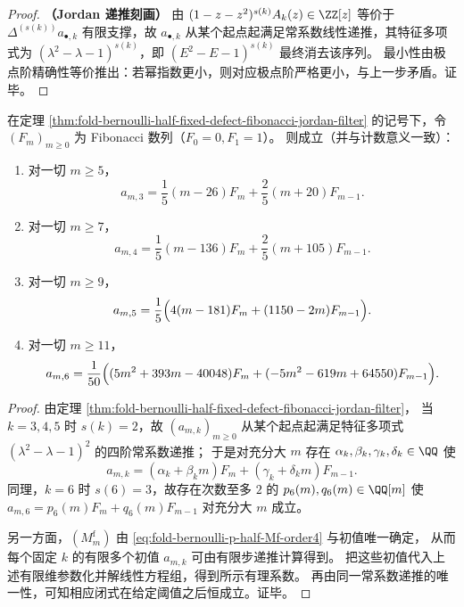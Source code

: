 \begin{proof}
\textbf{（Jordan 递推刻画）}
由 \((1-z-z^2)^{s(k)}A_k(z)\in\ZZ[z]\) 等价于 \(\Delta^{(s(k))}a_{\bullet,k}\) 有限支撑，故 \(a_{\bullet,k}\) 从某个起点起满足常系数线性递推，其特征多项式为 \((\lambda^2-\lambda-1)^{s(k)}\)，即 \((E^2-E-1)^{s(k)}\) 最终消去该序列。
最小性由极点阶精确性等价推出：若幂指数更小，则对应极点阶严格更小，与上一步矛盾。证毕。
\end{proof}


\begin{proposition}[缺陷阶 \(k=3,4,5,6\) 的显式闭式]\label{prop:fold-bernoulli-half-defect-3-6-explicit}
在定理 \ref{thm:fold-bernoulli-half-fixed-defect-fibonacci-jordan-filter} 的记号下，令 \((F_m)_{m\ge 0}\) 为 Fibonacci 数列（\(F_0=0,F_1=1\)）。
则成立（并与计数意义一致）：
\begin{enumerate}
  \item 对一切 \(m\ge 5\)，
  \[
  a_{m,3}
  =\frac{1}{5}(m-26)F_m+\frac{2}{5}(m+20)F_{m-1}.
  \]
  \item 对一切 \(m\ge 7\)，
  \[
  a_{m,4}
  =\frac{1}{5}(m-136)F_m+\frac{2}{5}(m+105)F_{m-1}.
  \]
  \item 对一切 \(m\ge 9\)，
  \[
  a_{m,5}
  =\frac{1}{5}\Bigl(4(m-181)F_m+(1150-2m)F_{m-1}\Bigr).
  \]
  \item 对一切 \(m\ge 11\)，
  \[
  a_{m,6}
  =\frac{1}{50}\Bigl((5m^2+393m-40048)F_m+(-5m^2-619m+64550)F_{m-1}\Bigr).
  \]
\end{enumerate}
\end{proposition}
\begin{proof}
由定理 \ref{thm:fold-bernoulli-half-fixed-defect-fibonacci-jordan-filter}，
当 \(k=3,4,5\) 时 \(s(k)=2\)，故 \((a_{m,k})_{m\ge 0}\) 从某个起点起满足特征多项式 \((\lambda^2-\lambda-1)^2\) 的四阶常系数递推；
于是对充分大 \(m\) 存在 \(\alpha_k,\beta_k,\gamma_k,\delta_k\in\QQ\) 使
\[
a_{m,k}=(\alpha_k+\beta_k m)F_m+(\gamma_k+\delta_k m)F_{m-1}.
\]
同理，\(k=6\) 时 \(s(6)=3\)，故存在次数至多 \(2\) 的 \(p_6(m),q_6(m)\in\QQ[m]\) 使
\(
a_{m,6}=p_6(m)F_m+q_6(m)F_{m-1}
\)
对充分大 \(m\) 成立。

另一方面，\((M_m^{\mathrm f})\) 由 \eqref{eq:fold-bernoulli-p-half-Mf-order4} 与初值唯一确定，
从而每个固定 \(k\) 的有限多个初值 \(a_{m,k}\) 可由有限步递推计算得到。
把这些初值代入上述有限维参数化并解线性方程组，得到所示有理系数。
再由同一常系数递推的唯一性，可知相应闭式在给定阈值之后恒成立。证毕。
\end{proof}

